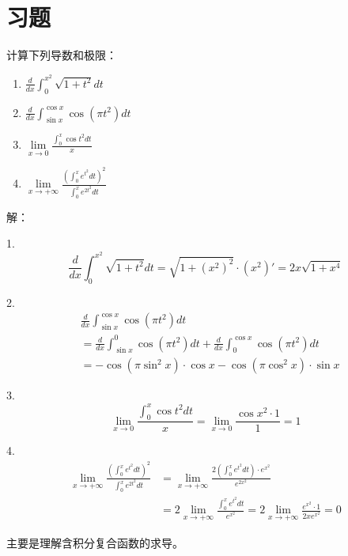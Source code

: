 \section{习题}

\begin{exercise}
计算下列导数和极限：
\begin{enumerate}
    \item $\frac{d}{dx}\int_0^{x^2}{\sqrt{1+t^2}dt}$
    \item $\frac{d}{dx}\int_{\sin x}^{\cos x}{\cos \left( \pi t^2 \right) dt}$
    \item $\underset{x\rightarrow 0}{\lim}\frac{\int_0^x{\cos t^2dt}}{x}$
    \item $\underset{x\rightarrow +\infty}{\lim}\frac{\left( \int_0^x{e^{t^2}dt} \right) ^2}{\int_0^x{e^{2t^2}dt}}$
\end{enumerate}
\end{exercise}

解：

1.
\[
\frac{d}{dx}\int_0^{x^2}{\sqrt{1+t^2}dt}=\sqrt{1+\left( x^2 \right) ^2}\cdot \left( x^2 \right) '=2x\sqrt{1+x^4}
\]

2.
\begin{align*}
&\frac{d}{dx}\int_{\sin x}^{\cos x}{\cos \left( \pi t^2 \right) dt} \\
&=\frac{d}{dx}\int_{\sin x}^0{\cos \left( \pi t^2 \right) dt}+\frac{d}{dx}\int_0^{\cos x}{\cos \left( \pi t^2 \right) dt} \\
&=-\cos \left( \pi \sin ^2x \right) \cdot \cos x-\cos \left( \pi \cos ^2x \right) \cdot \sin x
\end{align*}

3.
\[
\underset{x\rightarrow 0}{\lim}\frac{\int_0^x{\cos t^2dt}}{x}=\underset{x\rightarrow 0}{\lim}\frac{\cos x^2\cdot 1}{1}=1
\]

4.
\begin{align*}
\underset{x\rightarrow +\infty}{\lim}\frac{\left( \int_0^x{e^{t^2}dt} \right) ^2}{\int_0^x{e^{2t^2}dt}}&=\underset{x\rightarrow +\infty}{\lim}\frac{2\left( \int_0^x{e^{t^2}dt} \right) \cdot e^{x^2}}{e^{2x^2}} \\
&=2\underset{x\rightarrow +\infty}{\lim}\frac{\int_0^x{e^{t^2}dt}}{e^{x^2}}=2\underset{x\rightarrow +\infty}{\lim}\frac{e^{x^2}\cdot 1}{2xe^{x^2}}=0
\end{align*}

\begin{tcolorbox}
主要是理解含积分复合函数的求导。
\end{tcolorbox}

